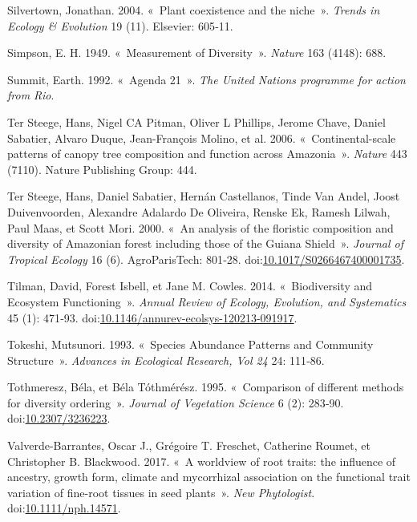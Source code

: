 \documentclass[11pt,french,A4paper,extrafontsizes,onecolumn,openright]{memoir}
\begin{document}
\hypertarget{ref-Silvertown2004}{}
Silvertown, Jonathan. 2004. «~Plant coexistence and the niche~».
\emph{Trends in Ecology \& Evolution} 19 (11). Elsevier: 605‑11.

\hypertarget{ref-Simpson1949}{}
Simpson, E. H. 1949. «~Measurement of Diversity~». \emph{Nature} 163
(4148): 688.

\hypertarget{ref-Summit1992}{}
Summit, Earth. 1992. «~Agenda 21~». \emph{The United Nations programme
for action from Rio}.

\hypertarget{ref-terSteege2006}{}
Ter Steege, Hans, Nigel CA Pitman, Oliver L Phillips, Jerome Chave,
Daniel Sabatier, Alvaro Duque, Jean-François Molino, et al. 2006.
«~Continental-scale patterns of canopy tree composition and function
across Amazonia~». \emph{Nature} 443 (7110). Nature Publishing Group:
444.

\hypertarget{ref-terSteege2000}{}
Ter Steege, Hans, Daniel Sabatier, Hernán Castellanos, Tinde Van Andel,
Joost Duivenvoorden, Alexandre Adalardo De Oliveira, Renske Ek, Ramesh
Lilwah, Paul Maas, et Scott Mori. 2000. «~An analysis of the floristic
composition and diversity of Amazonian forest including those of the
Guiana Shield~». \emph{Journal of Tropical Ecology} 16 (6).
AgroParisTech: 801‑28.
doi:\href{https://doi.org/10.1017/S0266467400001735}{10.1017/S0266467400001735}.

\hypertarget{ref-Tilman2014}{}
Tilman, David, Forest Isbell, et Jane M. Cowles. 2014. «~Biodiversity
and Ecosystem Functioning~». \emph{Annual Review of Ecology, Evolution,
and Systematics} 45 (1): 471‑93.
doi:\href{https://doi.org/10.1146/annurev-ecolsys-120213-091917}{10.1146/annurev-ecolsys-120213-091917}.

\hypertarget{ref-Tokeshi1993}{}
Tokeshi, Mutsunori. 1993. «~Species Abundance Patterns and Community
Structure~». \emph{Advances in Ecological Research, Vol 24} 24: 111‑86.

\hypertarget{ref-Tothmeresz1995}{}
Tothmeresz, Béla, et Béla Tóthmérész. 1995. «~Comparison of different
methods for diversity ordering~». \emph{Journal of Vegetation Science} 6
(2): 283‑90.
doi:\href{https://doi.org/10.2307/3236223}{10.2307/3236223}.

\hypertarget{ref-Valverde-Barrantes2017}{}
Valverde-Barrantes, Oscar J., Grégoire T. Freschet, Catherine Roumet, et
Christopher B. Blackwood. 2017. «~A worldview of root traits: the
influence of ancestry, growth form, climate and mycorrhizal association
on the functional trait variation of fine-root tissues in seed plants~».
\emph{New Phytologist}.
doi:\href{https://doi.org/10.1111/nph.14571}{10.1111/nph.14571}.
\end{document}
